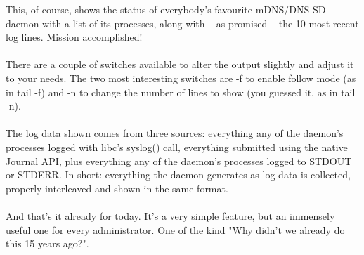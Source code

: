 \documentclass[titlepage]{article}
\begin{document}
This, of course, shows the status of everybody's favourite mDNS/DNS-SD daemon with a list of its processes, along with -- as promised -- the 10 most recent log lines. Mission accomplished!
\\
\\
There are a couple of switches available to alter the output slightly and adjust it to your needs. The two most interesting switches are -f to enable follow mode (as in tail -f) and -n to change the number of lines to show (you guessed it, as in tail -n).
\\
\\
The log data shown comes from three sources: everything any of the daemon's processes logged with libc's syslog() call, everything submitted using the native Journal API, plus everything any of the daemon's processes logged to STDOUT or STDERR. In short: everything the daemon generates as log data is collected, properly interleaved and shown in the same format.
\\
\\
And that's it already for today. It's a very simple feature, but an immensely useful one for every administrator. One of the kind "Why didn't we already do this 15 years ago?".
\end{document}
